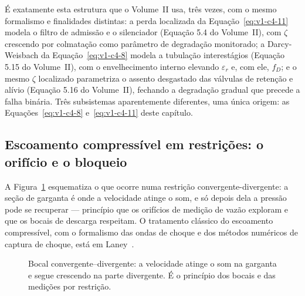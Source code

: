 \documentclass[12pt,a4paper]{article}
\numberwithin{equation}{section}
\numberwithin{table}{section}
\numberwithin{figure}{section}
\begin{document}
É exatamente esta estrutura que o Volume~II usa, três vezes, com o mesmo
formalismo e finalidades distintas: a perda localizada da
Equação~\eqref{eq:v1-c4-11} modela o filtro de admissão e o silenciador
(Equação 5.4 do Volume~II), com $\zeta$ crescendo por colmatação como
parâmetro de degradação monitorado; a Darcy-Weisbach da
Equação~\eqref{eq:v1-c4-8} modela a tubulação interestágios (Equação 5.15 do
Volume~II), com o envelhecimento interno elevando $\varepsilon_r$ e, com ele,
$f_D$; e o mesmo $\zeta$ localizado parametriza o assento desgastado das
válvulas de retenção e alívio (Equação 5.16 do Volume~II), fechando a
degradação gradual que precede a falha binária. Três subsistemas aparentemente
diferentes, uma única origem: as Equações~\eqref{eq:v1-c4-8}
e~\eqref{eq:v1-c4-11} deste capítulo.

\subsection{Escoamento compressível em restrições: o orifício e o
bloqueio}\label{sub:v1-c4-comprimivel}

A Figura~\ref{fig:v1-c4-2} esquematiza o que ocorre numa restrição
convergente-divergente: a seção de garganta é onde a velocidade atinge o
som, e só depois dela a pressão pode se recuperar --- princípio que os
orifícios de medição de vazão exploram e que os bocais de descarga respeitam. O
tratamento clássico do escoamento compressível, com o formalismo das ondas de
choque e dos métodos numéricos de captura de choque, está em
Laney~\cite{laney1998}.

\begin{figure}[H]
\centering
{}
\caption[Bocal convergente--divergente e regiões sub e supersônicas.]{%
Bocal convergente--divergente: a velocidade atinge o som na garganta e segue
crescendo na parte divergente. É o princípio dos bocais e das medições por
restrição.}
\label{fig:v1-c4-2}
\end{figure}
\end{document}
